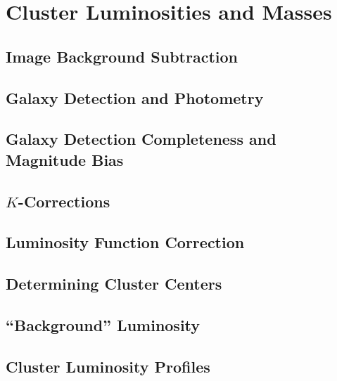 \documentclass[12pt]{ucthesis}
\begin{document}
\section{Cluster Luminosities and Masses} \label{sec:lum}


\subsection{Image Background Subtraction} \label{sec:lum_background}


\subsection{Galaxy Detection and Photometry} \label{sec:lum_photometry}


\subsection{Galaxy Detection Completeness and Magnitude Bias}
\label{sec:lum_correction}


\subsection{$K$-Corrections} \label{sec:lum_kcorr}


\subsection{Luminosity Function Correction} \label{sec:lum_faintgals}


\subsection{Determining Cluster Centers} \label{sec:lum_centers}


\subsection{``Background'' Luminosity} \label{sec:lum_goods}


\subsection{Cluster Luminosity Profiles} \label{sec:lum_profiles}

\end{document}
